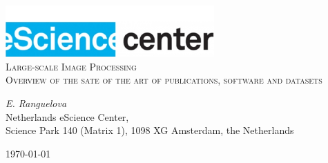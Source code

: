 \documentclass[a4paper,11pt]{article}
\begin{document}
\begin{titlepage}
\begin{center}
\includegraphics[width=0.6\textwidth]{fig/logo}\\[3cm]    
\textsc{\LARGE Large-scale Image Processing}\\[0.5cm]
\textsc{\large Overview of the sate of the art of publications, software and datasets}\\[0.5cm]
\vfill
\end{center}
{\large
\emph{E. Ranguelova} \\
}
{\large
{Netherlands eScience Center, \\
Science Park 140 (Matrix 1), 1098 XG Amsterdam, the Netherlands\\
}
}
\begin{center}
{\large \today}
\end{center}
\end{titlepage}

\tableofcontents

\newpage










\end{document}
